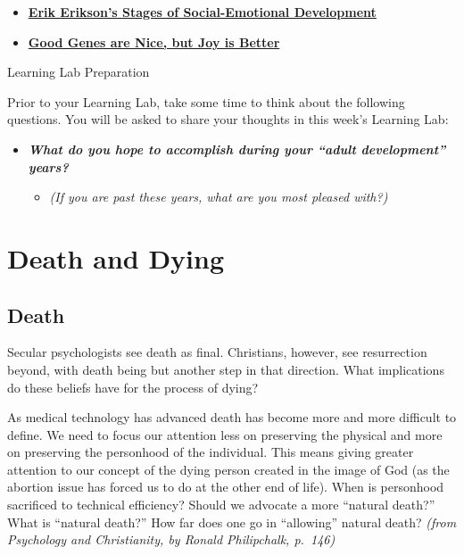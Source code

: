 \documentclass[
]{book}
\providecommand{\tightlist}{%
  \setlength{\itemsep}{0pt}\setlength{\parskip}{0pt}}
\begin{document}
\begin{itemize}
\tightlist
\item
  \href{https://childdevelopmentinfo.com/child-development/erickson/\#gs.d8mpcv}{\textbf{Erik Erikson's Stages of Social-Emotional Development}}\\
\item
  \href{https://news.harvard.edu/gazette/story/2017/04/over-nearly-80-years-harvard-study-has-been-showing-how-to-live-a-healthy-and-happy-life/}{\textbf{Good Genes are Nice, but Joy is Better}}
\end{itemize}

{Learning Lab Preparation}

Prior to your Learning Lab, take some time to think about the following questions. You will be asked to share your thoughts in this week's Learning Lab:

\begin{itemize}
\tightlist
\item
  \textbf{\emph{What do you hope to accomplish during your ``adult development'' years?}}

  \begin{itemize}
  \tightlist
  \item
    \emph{(If you are past these years, what are you most pleased with?)}
  \end{itemize}
\end{itemize}

\hypertarget{death-and-dying}{%
\section{Death and Dying}\label{death-and-dying}}

\hypertarget{death}{%
\subsection*{Death}\label{death}}

Secular psychologists see death as final. Christians, however, see resurrection beyond, with death being but another step in that direction. What implications do these beliefs have for the process of dying?

As medical technology has advanced death has become more and more difficult to define. We need to focus our attention less on preserving the physical and more on preserving the personhood of the individual. This means giving greater attention to our concept of the dying person created in the image of God (as the abortion issue has forced us to do at the other end of life). When is personhood sacrificed to technical efficiency? Should we advocate a more ``natural death?'' What is ``natural death?'' How far does one go in ``allowing'' natural death? \emph{(from Psychology and Christianity, by Ronald Philipchalk, p.~146)}
\end{document}
